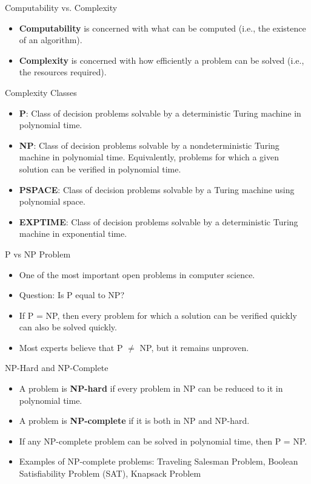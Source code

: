 \documentclass{beamer}
\begin{document}
\begin{frame}{Computability vs. Complexity}
\begin{itemize}
    \item \textbf{Computability} is concerned with what can be computed (i.e., the existence of an algorithm).
    \item \textbf{Complexity} is concerned with how efficiently a problem can be solved (i.e., the resources required).

\end{itemize}
\end{frame}

\begin{frame}{Complexity Classes}
\begin{itemize}
    \item \textbf{P}: Class of decision problems solvable by a deterministic Turing machine in polynomial time.
    \item \textbf{NP}: Class of decision problems solvable by a nondeterministic Turing machine in polynomial time. Equivalently, problems for which a given solution can be verified in polynomial time.
    \item \textbf{PSPACE}: Class of decision problems solvable by a Turing machine using polynomial space.
    \item \textbf{EXPTIME}: Class of decision problems solvable by a deterministic Turing machine in exponential time.
\end{itemize}
\end{frame} 
\begin{frame}{P vs NP Problem}
\begin{itemize}
    \item One of the most important open problems in computer science.
    \item Question: Is P equal to NP?
    \item If P = NP, then every problem for which a solution can be verified quickly can also be solved quickly.
    \item Most experts believe that P $\neq$ NP, but it remains unproven.
\end{itemize}
\end{frame} 
\begin{frame}{NP-Hard and NP-Complete}
\begin{itemize}
    \item A problem is \textbf{NP-hard} if every problem in NP can be reduced to it in polynomial time.
    \item A problem is \textbf{NP-complete} if it is both in NP and NP-hard.
    \item If any NP-complete problem can be solved in polynomial time, then P = NP.
    \item Examples of NP-complete problems: Traveling Salesman Problem, Boolean Satisfiability Problem (SAT), Knapsack Problem
\end{itemize}
\end{frame}
\end{document}
